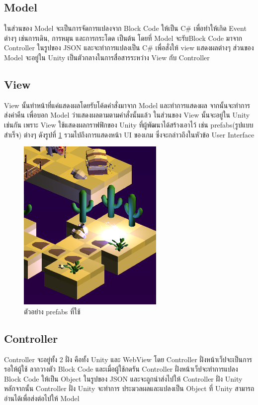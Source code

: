 \subsection{Model}
 ในส่วนของ Model จะเป็นการจัดการแปลงจาก Block Code ให้เป็น C\# เพื่อทำให้เกิด Event ต่างๆ เช่นการเดิน, การหมุน
 และการกระโดด เป็นต้น โดยที่ Model จะรับBlock Code มาจาก Controller ในรูปของ JSON
 และจะทำการแปลงเป็น C\# เพื่อสั่งให้ view แสดงผลต่างๆ ส่วนของ Model จะอยู่ใน Unity
 เป็นตัวกลางในการสื่อสารระหว่าง View กับ Controller

\subsection{View}
View นั้นทำหน้าที่แค่แสดงผลโดยรับโค้ดคำสั่งมาจาก Model และทำการแสดงผล จากนั้นจะทำการ
ส่งค่าคืน เพื่อบอก Model ว่าแสดงผลตามตามคำสั่งนั้นแล้ว ในส่วนของ View นั้นจะอยู่ใน
Unity เช่นกัน เพราะ View ใช้แสดงผลกราฟฟิกของ Unity ที่ผู้พัฒนาได้สร้างเอาไว้ เช่น prefabs(รูปแบบสำเร็จ) ต่างๆ ดังรูปที่ \ref{prefabs}
รวมไปถึงการแสดงหน้า UI ของเกม ซึ่งจะกล่าวถึงในหัวข้อ User Interface\par

\begin{figure}
    \begin{center}
    \includegraphics{pic/prefap.PNG}
    \end{center}
    \caption[ตัวอย่าง prefabs ที่ใช้]{ตัวอย่าง prefabs ที่ใช้ }
    \label{prefabs}
    \end{figure}
    


\subsection{Controller}
Controller จะอยู่ทั้ง 2 ฝั่ง คือทั้ง Unity และ WebView โดย Controller ฝั่งหน้าเว็ปจะเป็นการรอให้ผู้ใช้
ลากวางตัว Block Code และเมื่อผู้ใช้กดรัน Controller ฝั่งหน้าเว็ปจะทำการแปลง Block Code ให้เป็น Object 
ในรูปของ JSON และจะถูกนำส่งไปให้ Controller ฝั่ง Unity หลักจากนั้น Controller ฝั่ง Unity จะทำการ
ประมวลผลและแปลงเป็น Object ที่ Unity สามารถอ่านได้เพื่อส่งต่อไปให้ Model

